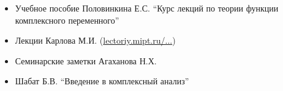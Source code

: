 \begin{itemize}[wide,  labelwidth=!, noitemsep, label=$\blacktriangleright$, labelindent = 0pt]
\item
Учебное пособие Половинкина Е.С. ``Курс лекций по теории функции комплексного переменного''
\item
Лекции Карлова М.И. (\href{http://lectoriy.mipt.ru/course/Maths-ComplexAnalysis-13L}{lectoriy.mipt.ru/...})
\item
Семинарские заметки Агаханова Н.Х.
\item
Шабат Б.В. ``Введение в комплексный анализ''
\end{itemize}
